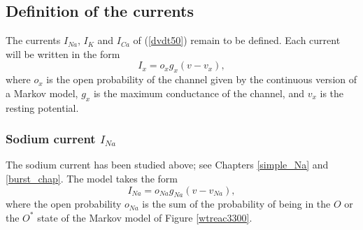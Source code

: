 
\subsection{Definition of the currents}

The currents $I_{Na},\, I_K$ and $I_{Ca}$ of (\ref{dvdt50}) remain to be defined. Each current will be written in the form
\[
I_x=o_x g_x (v-v_x),
\]
where  $o_x$ is the open probability of the channel given by the continuous version of a Markov model, $g_x$ is the maximum conductance of the channel, and $v_x$ is the resting potential.

\subsubsection{Sodium current $I_{Na}$}

The sodium current has been studied above; see Chapters \ref{simple_Na} and \ref{burst_chap}. The model takes the form
\begin{equation}
I_{Na}= o_{Na} g_{Na}(v-v_{Na}),   \label{J_Na}
\end{equation}
where the open probability $o_{Na}$ is the sum of the probability of being in the $O$ or the $O^*$ state of the Markov model of Figure  \ref{wtreac3300}. 

